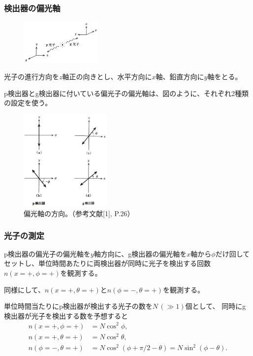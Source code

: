\documentclass[10pt,b5paper,papersize,dvipdfmx]{jsbook}
\begin{document}
%
\subsubsection{検出器の偏光軸} %

\begin{figure}[ht]
  \centering
  \includegraphics[width=40mm]{nkym/fig/zahyou-kei.jpeg}
\end{figure}

光子の進行方向を$z$軸正の向きとし、水平方向に$x$軸、鉛直方向に$y$軸をとる。

p検出器とg検出器に付いている偏光子の偏光軸は、図のように、それぞれ2種類の設定を使う。

\begin{figure}[ht]
  \centering
  \includegraphics[width=45mm]{nkym/fig/henkou-jiku.jpeg}
  \caption{偏光軸の方向。（参考文献[1], P.26）}
\end{figure}

%
\subsubsection{光子の測定} %

p検出器の偏光子の偏光軸を$y$軸方向に、g検出器の偏光軸を$x$軸から$\phi$だけ回してセットし、単位時間あたりに両検出器が同時に光子を検出する回数$n(x=+,\phi=+)$を観測する。\par
同様にして、$n(x=+,\theta=+)$と$n(\phi=-,\theta=+)$を観測する。

単位時間当たりにp検出器が検出する光子の数を$N \,(\gg 1)$個として、
同時にg検出器が光子を検出する数を予想すると
\begin{align*}
  n(x=+,\phi=+) &= N \cos^2\phi, \\
  n(x=+,\theta=+) &= N \cos^2\theta, \\
  n(\phi=-,\theta=+) &= N \cos^2(\phi + \pi/2 - \theta) = N \sin^2(\phi - \theta).
\end{align*}
\end{document}
